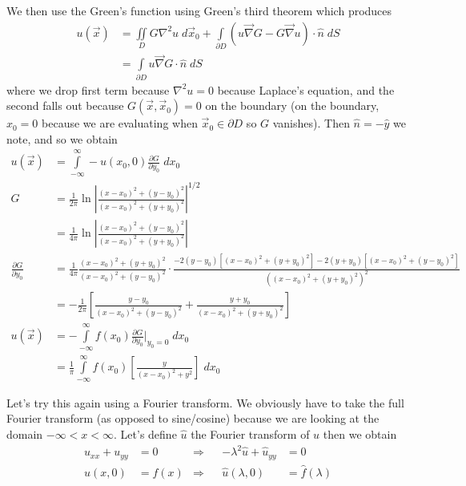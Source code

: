 \documentclass[12pt]{article}
\newcommand{\pd}[2]{\frac{\partial#1}{\partial#2}}
\newcommand{\abs}[1]{\left|#1\right|}
\begin{document}
We then use the Green's function using Green's third theorem which produces
\begin{align}
    u(\vec{x}) &= \iint\limits_D G\nabla^2u\; d\vec{x}_0 + \int\limits_{\partial D}^{}\left( u\vec{\nabla}G - G\vec{\nabla}u \right)\cdot \hat{n}\;dS\\
    &= \int\limits_{\partial D}^{}u\vec{\nabla}G \cdot \hat{n}\;dS
\end{align}
where we drop first term because $\nabla^2u = 0$ because Laplace's equation, and the second falls out because $G(\vec{x}, \vec{x}_0) = 0$ on the boundary (on the boundary, $x_0 = 0$ because we are evaluating when $\vec{x}_0 \in \partial D$ so $G$ vanishes). Then $\hat{n} = -\hat{y}$ we note, and so we obtain
\begin{align}
    u(\vec{x}) &= \int\limits_{-\infty}^{\infty}-u(x_0,0)\pd{G}{y_0}\;dx_0\\
    G &= \frac{1}{2\pi}\ln\abs{\frac{(x-x_0)^2 + (y-y_0)^2}{(x-x_0)^2 + (y + y_0)^2}}^{1/2}\\
    &= \frac{1}{4\pi}\ln\abs{\frac{(x-x_0)^2 + (y-y_0)^2}{(x-x_0)^2 + (y + y_0)^2}}\\
    \pd{G}{y_0} &= \frac{1}{4\pi}\frac{(x-x_0)^2 + (y + y_0)^2}{(x-x_0)^2 + (y-y_0)^2} \cdot \frac{-2\left( y-y_0 \right)\left[ (x-x_0)^2 + (y+y_0)^2 \right] - 2(y+y_0)\left[ (x-x_0)^2 + (y-y_0)^2 \right]}{\left((x-x_0)^2 + (y + y_0)^2\right)^2}\\
    &= -\frac{1}{2\pi}\left[ \frac{y-y_0}{(x-x_0)^2 + (y-y_0)^2} + \frac{y+y_0}{(x-x_0)^2 + (y+y_0)^2} \right]\\
    u(\vec{x}) &= -\int\limits_{-\infty}^{\infty}f(x_0)\pd{G}{y_0}\Bigg|_{y_0 = 0}\;dx_0\\
    &= \frac{1}{\pi}\int\limits_{-\infty}^{\infty}f(x_0)\left[ \frac{y}{\left( x-x_0 \right)^2 + y^2} \right]\;dx_0\label{Greensol}
\end{align}

Let's try this again using a Fourier transform. We obviously have to take the full Fourier transform (as opposed to sine/cosine) because we are looking at the domain $-\infty < x < \infty$. Let's define $\hat{u}$ the Fourier transform of $u$ then we obtain
\begin{align}
    u_{xx} + u_{yy} &= 0 &\Rightarrow&& -\lambda^2 \hat{u} + \hat{u}_{yy} &= 0\\
    u(x,0) &= f(x) &\Rightarrow&& \hat{u}(\lambda,0) &= \hat{f}(\lambda)
\end{align}
\end{document}
